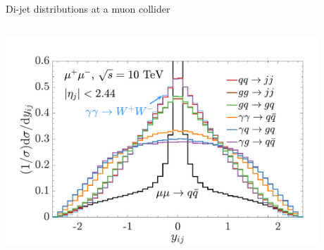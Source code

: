 \documentclass[aspectratio=169]{beamer}
\begin{document}
\begin{frame}{Di-jet distributions at a muon collider}
\begin{columns}
	\begin{column}{0.44\textwidth}
		\includegraphics[width=0.88\textwidth]{figs/dYjj_mu10TeV_10d_3pt_s20_Norm}
		\end{column}
	\end{columns}
\end{frame}

\end{document}
